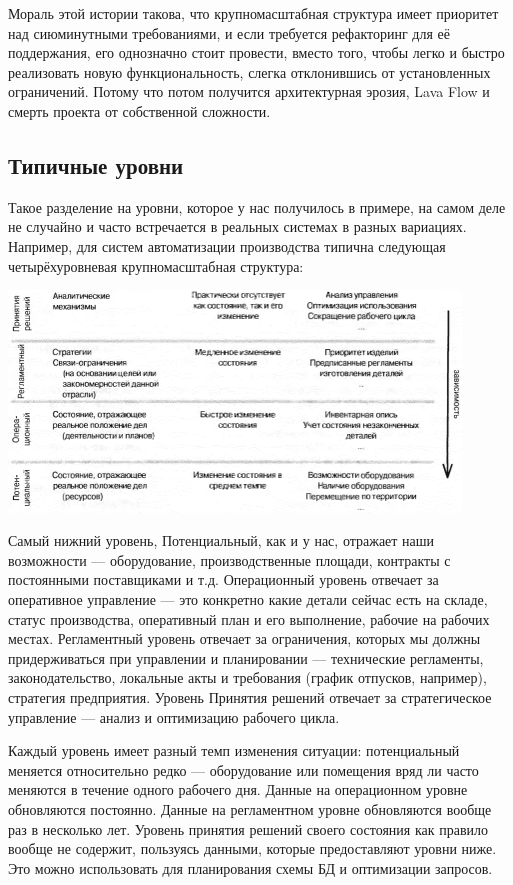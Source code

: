 \documentclass{../../text-style}
\begin{document}
Мораль этой истории такова, что крупномасштабная структура имеет приоритет над сиюминутными требованиями, и если требуется рефакторинг для её поддержания, его однозначно стоит провести, вместо того, чтобы легко и быстро реализовать новую функциональность, слегка отклонившись от установленных ограничений. Потому что потом получится архитектурная эрозия, Lava Flow и смерть проекта от собственной сложности.

\subsection{Типичные уровни}

Такое разделение на уровни, которое у нас получилось в примере, на самом деле не случайно и часто встречается в реальных системах в разных вариациях. Например, для систем автоматизации производства типична следующая четырёхуровневая крупномасштабная структура:

\begin{center}
    \includegraphics[width=0.9\textwidth]{factoryAutomationLayers.png}
\end{center}

Самый нижний уровень, Потенциальный, как и у нас, отражает наши возможности --- оборудование, производственные площади, контракты с постоянными поставщиками и т.д. Операционный уровень отвечает за оперативное управление --- это конкретно какие детали сейчас есть на складе, статус производства, оперативный план и его выполнение, рабочие на рабочих местах. Регламентный уровень отвечает за ограничения, которых мы должны придерживаться при управлении и планировании --- технические регламенты, законодательство, локальные акты и требования (график отпусков, например), стратегия предприятия. Уровень Принятия решений отвечает за стратегическое управление --- анализ и оптимизацию рабочего цикла.

Каждый уровень имеет разный темп изменения ситуации: потенциальный меняется относительно редко --- оборудование или помещения вряд ли часто меняются в течение одного рабочего дня. Данные на операционном уровне обновляются постоянно. Данные на регламентном уровне обновляются вообще раз в несколько лет. Уровень принятия решений своего состояния как правило вообще не содержит, пользуясь данными, которые предоставляют уровни ниже. Это можно использовать для планирования схемы БД и оптимизации запросов.
\end{document}
